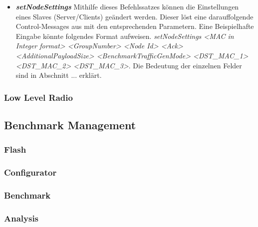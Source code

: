 \begin{itemize}
	\item \textit{\textbf{setNodeSettings}} Mithilfe dieses Befehlssatzes können die Einstellungen eines Slaves (Server/Clients) geändert werden. Dieser löst eine darauffolgende Control-Messages aus mit den entsprechenden Parametern. Eine Beispielhafte Eingabe könnte folgendes Format aufweisen. 
	\textit{setNodeSettings <MAC in Integer format> <GroupNumber> <Node Id> <Ack> <AdditionalPayloadSize> <BenchmarkTrafficGenMode> <DST\_MAC\_1> 
	<DST\_MAC\_2> <DST\_MAC\_3>}. Die Bedeutung der einzelnen Felder sind in Abschnitt ... erklärt. 
	
\end{itemize}



\subsubsection{Low Level Radio}\label{subsubsec:LowLevelRadio}


\subsection{Benchmark Management}\label{subsec:Benchmark Management}

\subsubsection{Flash}\label{subsubsec:Flash}

\subsubsection{Configurator}\label{subsubsec:Configurator}

\subsubsection{Benchmark}\label{subsubsec:Benchmark}

\subsubsection{Analysis}\label{subsubsec:Analysis}

